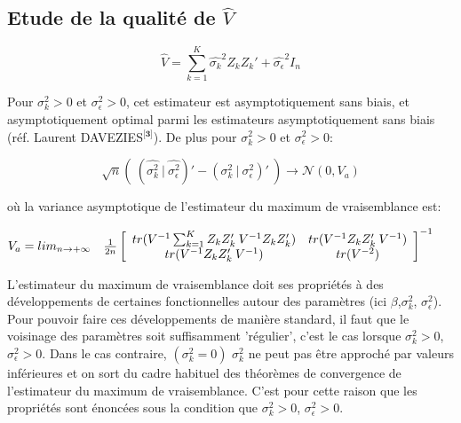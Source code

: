 \documentclass[11pt,fleqn]{book} %
\begin{document}
	\newpage
	
	\subsection{Etude de la qualité de $\hat{V}$}
	
	
	\vspace{1em}
	
	\[
	\hat{V}=\sum_{k=1}^{K} \hat{\sigma_k}^2 Z_k Z_k' + \hat{\sigma_{\epsilon}}^2 I_n
	\]
	
	Pour $\sigma_k^2>0$ et $\sigma_{\epsilon}^2>0$, cet estimateur est asymptotiquement sans biais, et asymptotiquement optimal parmi les estimateurs asymptotiquement sans biais (réf. Laurent DAVEZIES$^\textbf{[3]}$). De plus pour $\sigma_k^2>0$ et $\sigma_{\epsilon}^2>0$:
	
	
	\[ 
	\sqrt{n}\left(\:(\hat{\sigma_k^2}\:|\:\hat{\sigma_{\epsilon}^2})'-(\sigma_k^2\:|\:\sigma_{\epsilon}^2)' \:\right) \rightarrow \mathcal{N}(0,V_a)
	\]
	
	où la variance asymptotique de l'estimateur du maximum de vraisemblance est:
	
	\vspace{1em}
	
	$V_a =lim_{n\rightarrow +\infty}\quad\frac{1}{2n}\left[
	\begin{array}{ c c }
		tr(V^{-1} \sum_{k=1}^{K} Z_k Z_k'\:V^{-1} Z_k Z_k') & tr(V^{-1} Z_k Z_k'\:V^{-1}) \\
		tr(V^{-1} Z_k Z_k'\:V^{-1}) & tr(V^{-2})  
	\end{array} \right]^{-1}$ 
	\vspace{2em}
	
	\begin{remark}
		L’estimateur du maximum de vraisemblance doit ses propriétés à des développements
		de certaines fonctionnelles autour des paramètres (ici $\beta$,$\sigma_k^2$, $\sigma_{\epsilon}^2$). Pour pouvoir faire ces développements de manière standard, il faut que le voisinage des paramètres soit suffisamment
		'régulier', c’est le cas lorsque $\sigma_k^2>0$, $\sigma_{\epsilon}^2>0$. Dans le cas contraire, $(\sigma_k^2=0)$  $\sigma_k^2$ ne peut pas
		être approché par valeurs inférieures et on sort du cadre habituel des théorèmes de convergence de
		l’estimateur du maximum de vraisemblance. C’est pour cette raison que les propriétés sont énoncées
		sous la condition que $\sigma_k^2>0$, $\sigma_{\epsilon}^2>0$.
	\end{remark}
	
	
	
\end{document}

